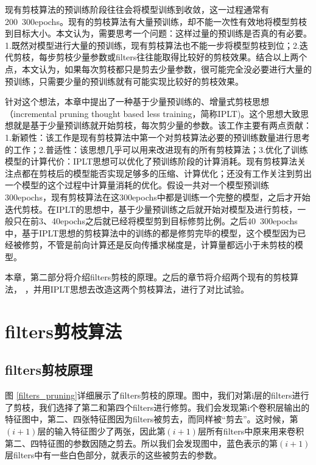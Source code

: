 \documentclass[ pdftex, oneside, master]{NJUthesis}
\begin{document}
现有剪枝算法的预训练阶段往往会将模型训练到收敛，这一过程通常有200~300epochs。现有的剪枝算法有大量预训练，却不能一次性有效地将模型剪枝到目标大小。本文认为，需要思考一个问题：这样过量的预训练是否真的有必要。1.既然对模型进行大量的预训练，现有剪枝算法也不能一步将模型剪枝到位；2.迭代剪枝，每步剪枝少量参数或filters往往能取得比较好的剪枝效果。结合以上两个点，本文认为，如果每次剪枝都只是剪去少量参数，很可能完全没必要进行大量的预训练，只需要少量的预训练就有可能实现比较好的剪枝效果。

针对这个想法，本章中提出了一种基于少量预训练的、增量式剪枝思想（incremental pruning thought based less training，简称IPLT)。这个思想大致思想就是基于少量预训练就开始剪枝，每次剪少量的参数。该工作主要有两点贡献：1.新颖性：该工作是现有剪枝算法中第一个对剪枝算法必要的预训练数量进行思考的工作；2.普适性：该思想几乎可以用来改进现有的所有剪枝算法；3.优化了训练模型的计算代价：IPLT思想可以优化了预训练阶段的计算消耗。现有剪枝算法关注点都在剪枝后的模型能否实现足够多的压缩、计算优化；还没有工作关注到剪出一个模型的这个过程中计算量消耗的优化。假设一共对一个模型预训练300epochs，现有剪枝算法在这300epochs中都是训练一个完整的模型，之后才开始迭代剪枝。在IPLT的思想中，基于少量预训练之后就开始对模型及进行剪枝，一般只在前3、40epochs之后就已经将模型剪到目标修剪比例。之后40~300epochs中，基于IPLT思想的剪枝算法中的训练的都是修剪完毕的模型，这个模型因为已经被修剪，不管是前向计算还是反向传播求梯度是，计算量都远小于未剪枝的模型。

本章，第二部分将介绍filters剪枝的原理。之后的章节将介绍两个现有的剪枝算法\cite{17}， \cite{27}，并用IPLT思想去改造这两个剪枝算法，进行了对比试验。




\section{filters剪枝算法}

\subsection{filters剪枝原理}

图 \ref{filters_pruning}详细展示了filters剪枝的原理。图中，我们对第i层的filters进行了剪枝，我们选择了第二和第四个filters进行修剪。我们会发现第i个卷积层输出的特征图中，第二、四张特征图因为filters被剪去，而同样被“剪去”。这时候，第$(i+1)$层的输入特征图少了两张，因此第$(i+1)$层所有filters中原来用来卷积第二、四特征图的参数因随之剪去。所以我们会发现图中，蓝色表示的第$(i+1)$层filters中有一些白色部分，就表示的这些被剪去的参数。
\end{document}
